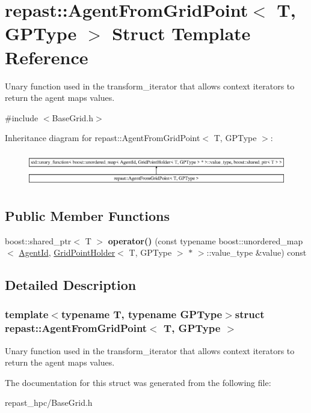 \hypertarget{structrepast_1_1_agent_from_grid_point}{\section{repast\-:\-:Agent\-From\-Grid\-Point$<$ T, G\-P\-Type $>$ Struct Template Reference}
\label{structrepast_1_1_agent_from_grid_point}
}


Unary function used in the transform\-\_\-iterator that allows context iterators to return the agent maps values.  




{\ttfamily \#include $<$Base\-Grid.\-h$>$}

Inheritance diagram for repast\-:\-:Agent\-From\-Grid\-Point$<$ T, G\-P\-Type $>$\-:\begin{figure}[H]
\begin{center}
\leavevmode
\includegraphics[height=1.505376cm]{structrepast_1_1_agent_from_grid_point}
\end{center}
\end{figure}
\subsection*{Public Member Functions}
\begin{DoxyCompactItemize}
\item 
\hypertarget{structrepast_1_1_agent_from_grid_point_a6ac944644e16ab7ccfb47c0a1acbadae}{boost\-::shared\-\_\-ptr$<$ T $>$ {\bfseries operator()} (const typename boost\-::unordered\-\_\-map$<$ \hyperlink{classrepast_1_1_agent_id}{Agent\-Id}, \hyperlink{structrepast_1_1_grid_point_holder}{Grid\-Point\-Holder}$<$ T, G\-P\-Type $>$ $\ast$ $>$\-::value\-\_\-type \&value) const }\label{structrepast_1_1_agent_from_grid_point_a6ac944644e16ab7ccfb47c0a1acbadae}

\end{DoxyCompactItemize}


\subsection{Detailed Description}
\subsubsection*{template$<$typename T, typename G\-P\-Type$>$struct repast\-::\-Agent\-From\-Grid\-Point$<$ T, G\-P\-Type $>$}

Unary function used in the transform\-\_\-iterator that allows context iterators to return the agent maps values. 

The documentation for this struct was generated from the following file\-:\begin{DoxyCompactItemize}
\item 
repast\-\_\-hpc/Base\-Grid.\-h\end{DoxyCompactItemize}
